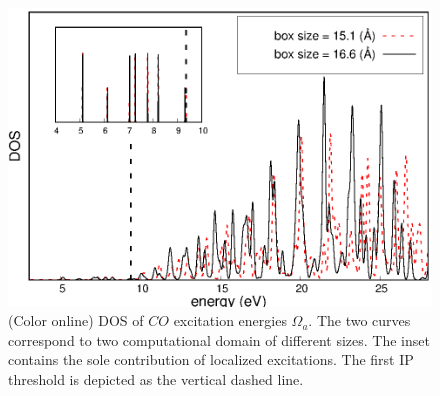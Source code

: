 \documentclass[reprint,aps,prb]{revtex4-1}
\begin{document}
\begin{figure}[ht]
\includegraphics[scale=0.6]{Fig4_CO_dos.eps}
\caption{(Color online) DOS of $CO$ excitation energies $\Omega_a$. The two curves correspond to two computational domain of different sizes. The inset contains the sole contribution of localized excitations. The first IP threshold is depicted as the vertical dashed line.}
\label{CO_exc}
\end{figure}
\end{document}
